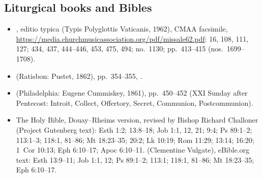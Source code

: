 {\scriptsize
\subsection*{Liturgical books and Bibles}
\begin{itemize}\setlength{\itemsep}{0.15em}\setlength{\parskip}{0pt}
\item {}, editio typica (Typis Polyglottis Vaticanis, 1962), CMAA facsimile, \url{https://media.churchmusicassociation.org/pdf/missale62.pdf}:  16, 108, 111, 127;  434, 437, 444--446, 453, 475, 494;  no.~1130; pp.~413--415 (nos.~1699--1708).
\item {} (Ratisbon: Pustet, 1862), pp.~354--355, .
\item {} (Philadelphia: Eugene Cummiskey, 1861), pp.~450--452 (XXI Sunday after Pentecost: Introit, Collect, Offertory, Secret, Communion, Postcommunion).
\item The Holy Bible, Douay--Rheims version, revised by Bishop Richard Challoner (Project Gutenberg text): Esth 1:2; 13:8--18; Job 1:1, 12, 21; 9:4; Ps 89:1--2; 113:1--3; 118:1, 81--86; Mt 18:23--35; 20:2; Lk 10:19; Rom 11:29; 13:14; 16:20; 1~Cor 10:13; Eph 6:10--17; Apoc 6:10--11.  (Clementine Vulgate), eBible.org text: Esth 13:9--11; Job 1:1, 12; Ps 89:1--2; 113:1; 118:1, 81--86; Mt 18:23--35; Eph 6:10--17.
\end{itemize}

}
